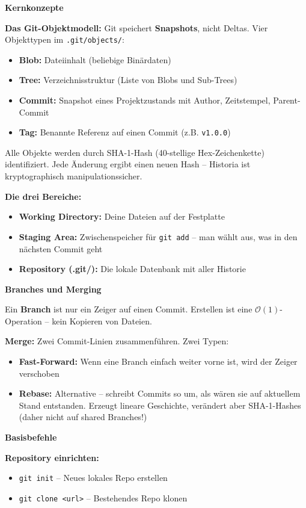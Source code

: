 \textbf{Kernkonzepte}

\textbf{Das Git-Objektmodell:} Git speichert \textbf{Snapshots}, nicht Deltas. Vier Objekttypen im \texttt{.git/objects/}:
\begin{itemize}
  \item \textbf{Blob:} Dateiinhalt (beliebige Binärdaten)
  \item \textbf{Tree:} Verzeichnisstruktur (Liste von Blobs und Sub-Trees)
  \item \textbf{Commit:} Snapshot eines Projektzustands mit Author, Zeitstempel, Parent-Commit
  \item \textbf{Tag:} Benannte Referenz auf einen Commit (z.B. \texttt{v1.0.0})
\end{itemize}

Alle Objekte werden durch SHA-1-Hash (40-stellige Hex-Zeichenkette) identifiziert. Jede Änderung ergibt einen neuen Hash -- Historia ist kryptographisch manipulationssicher.

\textbf{Die drei Bereiche:}
\begin{itemize}
  \item \textbf{Working Directory:} Deine Dateien auf der Festplatte
  \item \textbf{Staging Area:} Zwischenspeicher für \texttt{git add} -- man wählt aus, was in den nächsten Commit geht
  \item \textbf{Repository (.git/):} Die lokale Datenbank mit aller Historie
\end{itemize}

\textbf{Branches und Merging}

Ein \textbf{Branch} ist nur ein Zeiger auf einen Commit. Erstellen ist eine $\mathcal{O}(1)$-Operation -- kein Kopieren von Dateien.

\textbf{Merge:} Zwei Commit-Linien zusammenführen. Zwei Typen:
\begin{itemize}
  \item \textbf{Fast-Forward:} Wenn eine Branch einfach weiter vorne ist, wird der Zeiger verschoben
  \item \textbf{Rebase:} Alternative -- schreibt Commits so um, als wären sie auf aktuellem Stand entstanden. Erzeugt lineare Geschichte, verändert aber SHA-1-Hashes (daher nicht auf shared Branches!)
\end{itemize}

\textbf{Basisbefehle}

\textbf{Repository einrichten:}
\begin{itemize}
  \item \texttt{git init} -- Neues lokales Repo erstellen
  \item \texttt{git clone <url>} -- Bestehendes Repo klonen
\end{itemize}

